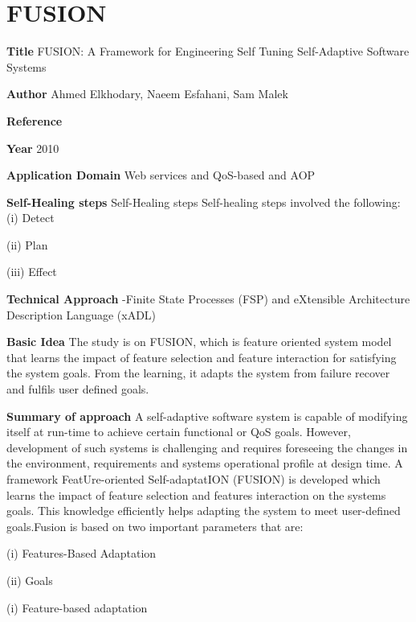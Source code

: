 \section{FUSION}\label{FUSION}
\begin{compactitem}
\item[\textbf{Title}]FUSION: A Framework for Engineering Self Tuning Self-Adaptive Software Systems
\item[\textbf{Author}]Ahmed Elkhodary,  Naeem  Esfahani, Sam Malek\item[\textbf{Reference}] 
\cite{elkhodary_fusion:_2012}

\item[\textbf{Year}] 2010

\item[\textbf{Application Domain}]Web services and QoS-based and AOP

\item[\textbf{Self-Healing steps}] Self-Healing steps   Self-healing steps involved the following:
(i) Detect 

(ii) Plan

(iii) Effect

\item[\textbf{Technical Approach}]
-Finite State Processes (FSP) and eXtensible Architecture Description Language (xADL)

\item[\textbf{Basic Idea}]  The study is on FUSION, which is feature oriented system model that learns the impact of feature selection and feature interaction for satisfying the system goals. From the learning, it adapts the system from failure recover and fulfils user defined goals. 

\item[\textbf{Summary of approach}] 
A self-adaptive software system is capable of modifying itself at run-time to achieve certain 
functional or QoS goals. However, development of such systems is challenging and requires foreseeing the changes in the environment, requirements and systems operational profile at design time. A framework FeatUre-oriented Self-adaptatION (FUSION) is developed which learns the 
impact of feature selection and features interaction on the systems goals. This knowledge efficiently helps adapting the system to meet user-defined goals.Fusion is based on two important parameters that are:

(i) Features-Based Adaptation

(ii) Goals

(i) Feature-based adaptation


\end{compactitem}
